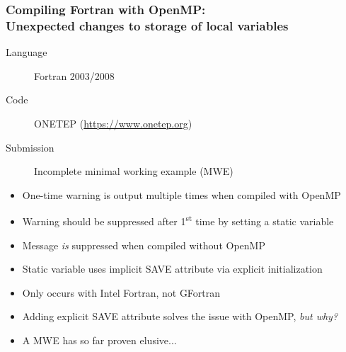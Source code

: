 \documentclass{beamer}
\begin{document}
\begin{frame}
  \frametitle{Compiling Fortran with OpenMP:\\ Unexpected changes to storage of local variables}
    \begin{description}
      \item[Language] Fortran 2003/2008
      \item[Code] ONETEP (\url{https://www.onetep.org})
      \item[Submission] Incomplete minimal working example (MWE)
    \end{description}
    { \footnotesize
    \begin{itemize}
      \item One-time warning is output multiple times when compiled with OpenMP
      \item Warning should be suppressed after 1\textsuperscript{st} time by setting a static variable
      \item Message \emph{is} suppressed when compiled without OpenMP
      \item Static variable uses implicit SAVE attribute via explicit initialization
      \item Only occurs with Intel Fortran, not GFortran
      \item Adding explicit SAVE attribute solves the issue with OpenMP, \emph{but why?}
      \item A MWE has so far proven elusive...
    \end{itemize}
    }
\end{frame}
\end{document}
